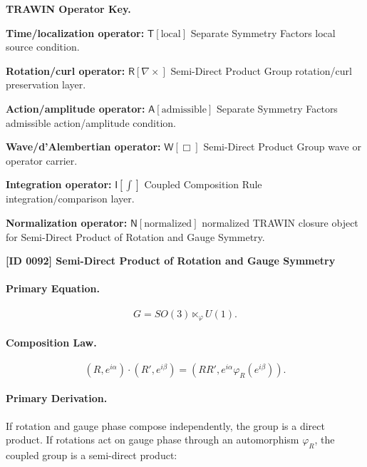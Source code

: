 \par\vspace{0.45\baselineskip}
\noindent\begin{minipage}[t]{\linewidth}
\begingroup
\small
\raggedright
\textbf{TRAWIN Operator Key.}\par
\noindent\textbf{Time/localization operator:} $\mathsf{T}\!\left[\mathrm{local}\right]$ Separate Symmetry Factors local source condition.\par
\noindent\textbf{Rotation/curl operator:} $\mathsf{R}\!\left[\nabla\times\right]$ Semi-Direct Product Group rotation/curl preservation layer.\par
\noindent\textbf{Action/amplitude operator:} $\mathsf{A}\!\left[\mathrm{admissible}\right]$ Separate Symmetry Factors admissible action/amplitude condition.\par
\noindent\textbf{Wave/d'Alembertian operator:} $\mathsf{W}\!\left[\Box\right]$ Semi-Direct Product Group wave or operator carrier.\par
\noindent\textbf{Integration operator:} $\mathsf{I}\!\left[\int\right]$ Coupled Composition Rule integration/comparison layer.\par
\noindent\textbf{Normalization operator:} $\mathsf{N}\!\left[\mathrm{normalized}\right]$ normalized TRAWIN closure object for Semi-Direct Product of Rotation and Gauge Symmetry.\par
\endgroup
\end{minipage}

\clearpage
\noindent\textbf{[ID 0092] Semi-Direct Product of Rotation and Gauge Symmetry}\par
\vspace{0.35em}
\paragraph{Primary Equation.}
\begin{equation}
G=SO(3)\ltimes_{\varphi} U(1).
\end{equation}

\paragraph{Composition Law.}
\begin{equation}
(R,e^{i\alpha})\cdot(R',e^{i\beta})
=
\left(
RR',
e^{i\alpha}\varphi_R(e^{i\beta})
\right).
\end{equation}

\paragraph{Primary Derivation.}
If rotation and gauge phase compose independently, the group is a direct product.  
If rotations act on gauge phase through an automorphism $\varphi_R$, the coupled group is a semi-direct product:

